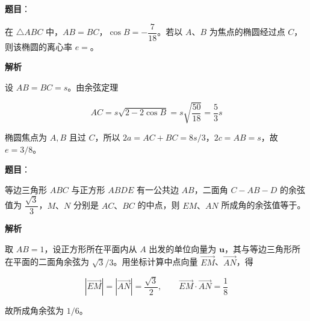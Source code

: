 \begin{answer}

\textbf{题目}：

在 $\triangle ABC$ 中，$AB=BC$，$\cos B=-\dfrac7{18}$。若以 $A\text{、}B$ 为焦点的椭圆经过点 $C$，则该椭圆的离心率 $e=$\gkblank{}。

\textbf{解析}

设 $AB=BC=s$。由余弦定理

\nopagebreak[4]
\[
AC=s\sqrt{2-2\cos B}=s\sqrt{\frac{50}{18}}=\frac53s
\]

椭圆焦点为 $A,B$ 且过 $C$，所以 $2a=AC+BC=8s/3$，$2c=AB=s$，故 $e=3/8$。


\end{answer}
\begin{answer}

\textbf{题目}：

等边三角形 $ABC$ 与正方形 $ABDE$ 有一公共边 $AB$，二面角 $C-AB-D$ 的余弦值为 $\dfrac{\sqrt3}{3}$，$M\text{、}N$ 分别是 $AC\text{、}BC$ 的中点，则 $EM\text{、}AN$ 所成角的余弦值等于\gkblank{}。

\textbf{解析}

取 $AB=1$，设正方形所在平面内从 $A$ 出发的单位向量为 $\boldsymbol u$，其与等边三角形所在平面的二面角余弦为 $\sqrt3/3$。用坐标计算中点向量 $\overrightarrow{EM}$、$\overrightarrow{AN}$，得

\nopagebreak[4]
\[
|\overrightarrow{EM}|=|\overrightarrow{AN}|=\frac{\sqrt3}{2},\qquad
\overrightarrow{EM}\cdot\overrightarrow{AN}=\frac18
\]

故所成角余弦为 $1/6$。


\end{answer}
